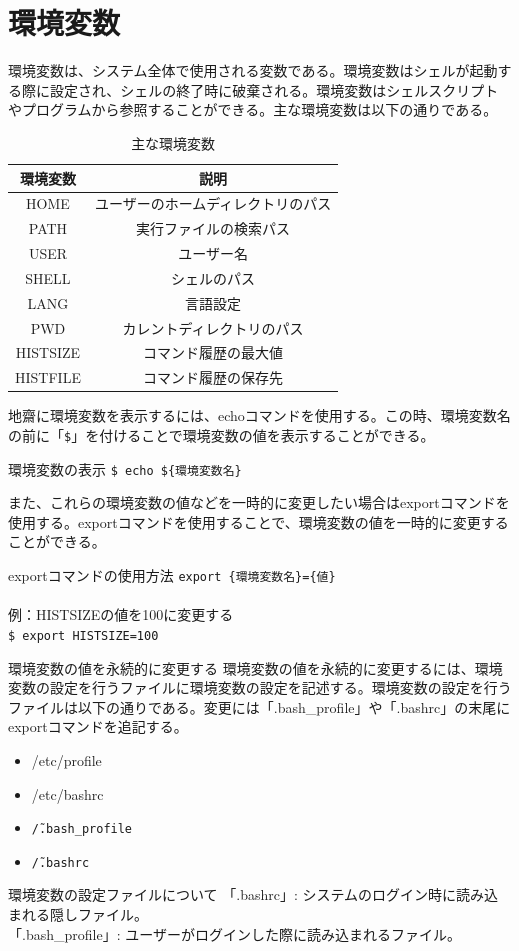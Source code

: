 \documentclass[a4paper, 11pt, dvipdfmx]{jsarticle}
\begin{document}
\section{環境変数}
環境変数は、システム全体で使用される変数である。環境変数はシェルが起動する際に設定され、シェルの終了時に破棄される。環境変数はシェルスクリプトやプログラムから参照することができる。主な環境変数は以下の通りである。\\
\begin{table}[H]
  \centering
  \caption{主な環境変数}
  \begin{tabular}{|c|c|} \hline
    環境変数 & 説明 \\ \hline
    HOME & ユーザーのホームディレクトリのパス \\
    PATH & 実行ファイルの検索パス \\
    USER & ユーザー名 \\
    SHELL & シェルのパス \\
    LANG & 言語設定 \\
    PWD & カレントディレクトリのパス \\
    HISTSIZE & コマンド履歴の最大値 \\
    HISTFILE & コマンド履歴の保存先 \\ \hline
  \end{tabular}
\end{table}
地齋に環境変数を表示するには、echoコマンドを使用する。この時、環境変数名の前に「\texttt{\$}」を付けることで環境変数の値を表示することができる。
\begin{commandbox}{環境変数の表示}
  \verb|$ echo ${環境変数名}|
\end{commandbox}
また、これらの環境変数の値などを一時的に変更したい場合はexportコマンドを使用する。exportコマンドを使用することで、環境変数の値を一時的に変更することができる。
\begin{commandbox}{exportコマンドの使用方法}
  \verb|export {環境変数名}={値}|\\\\
  例：HISTSIZEの値を100に変更する\\
  \verb|$ export HISTSIZE=100|
\end{commandbox}
\begin{hosokubox}{環境変数の値を永続的に変更する}
  環境変数の値を永続的に変更するには、環境変数の設定を行うファイルに環境変数の設定を記述する。環境変数の設定を行うファイルは以下の通りである。変更には「.bash\_profile」や「.bashrc」の末尾にexportコマンドを追記する。
  \begin{itemize}
    \item /etc/profile
    \item /etc/bashrc
    \item \texttt{\~/.bash\_profile}
    \item \texttt{\~/.bashrc}
  \end{itemize}
\end{hosokubox}
\begin{johobox}{環境変数の設定ファイルについて}
  「.bashrc」: システムのログイン時に読み込まれる隠しファイル。\\
  「.bash\_profile」: ユーザーがログインした際に読み込まれるファイル。
\end{johobox}
\end{document}
